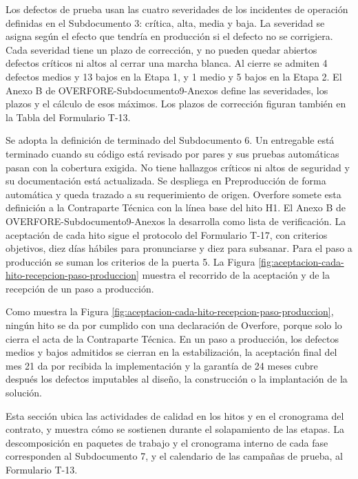 \documentclass[subdoc]{../../comun/overfore}
\begin{document}
Los defectos de prueba usan las cuatro severidades de los incidentes de operación definidas en el Subdocumento 3: crítica, alta, media y baja. La severidad se asigna según el efecto que tendría en producción si el defecto no se corrigiera. Cada severidad tiene un plazo de corrección, y no pueden quedar abiertos defectos críticos ni altos al cerrar una marcha blanca. Al cierre se admiten 4 defectos medios y 13 bajos en la Etapa 1, y 1 medio y 5 bajos en la Etapa 2. El Anexo B de OVERFORE-Subdocumento9-Anexos define las severidades, los plazos y el cálculo de esos máximos. Los plazos de corrección figuran también en la Tabla  del Formulario T-13.

Se adopta la definición de terminado del Subdocumento 6. Un entregable está terminado cuando su código está revisado por pares y sus pruebas automáticas pasan con la cobertura exigida. No tiene hallazgos críticos ni altos de seguridad y su documentación está actualizada. Se despliega en Preproducción de forma automática y queda trazado a su requerimiento de origen. Overfore somete esta definición a la Contraparte Técnica con la línea base del hito H1. El Anexo B de OVERFORE-Subdocumento9-Anexos la desarrolla como lista de verificación. La aceptación de cada hito sigue el protocolo del Formulario T-17, con criterios objetivos, diez días hábiles para pronunciarse y diez para subsanar. Para el paso a producción se suman los criterios de la puerta 5. La Figura \ref{fig:aceptacion-cada-hito-recepcion-paso-produccion} muestra el recorrido de la aceptación y de la recepción de un paso a producción.

Como muestra la Figura \ref{fig:aceptacion-cada-hito-recepcion-paso-produccion}, ningún hito se da por cumplido con una declaración de Overfore, porque solo lo cierra el acta de la Contraparte Técnica. En un paso a producción, los defectos medios y bajos admitidos se cierran en la estabilización, la aceptación final del mes 21 da por recibida la implementación y la garantía de 24 meses cubre después los defectos imputables al diseño, la construcción o la implantación de la solución.

Esta sección ubica las actividades de calidad en los hitos y en el cronograma del contrato, y muestra cómo se sostienen durante el solapamiento de las etapas. La descomposición en paquetes de trabajo y el cronograma interno de cada fase corresponden al Subdocumento 7, y el calendario de las campañas de prueba, al Formulario T-13.
\end{document}
